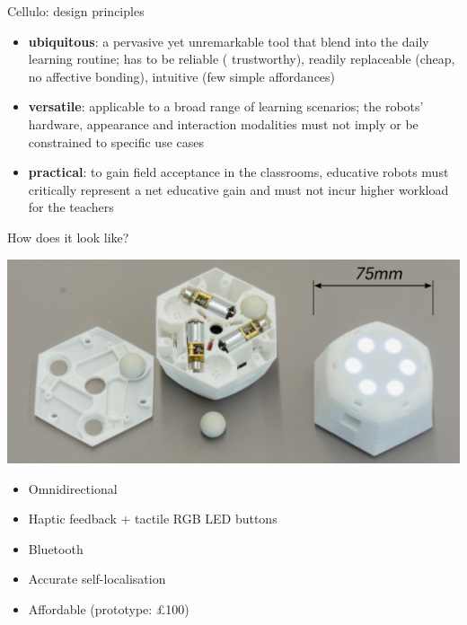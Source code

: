 \documentclass[compress]{beamer}
\begin{document}
{
 \begin{frame}{Cellulo: design principles}

     \begin{itemize}
         \item<1-> {\bf ubiquitous}: a pervasive yet unremarkable tool
             that blend into the daily learning routine; has to be reliable (\ie
             trustworthy), readily replaceable (\ie cheap, no affective bonding), intuitive (\ie few
             simple affordances)

         \item<2-> {\bf versatile}: applicable to a broad range of learning
             scenarios; the robots’ hardware, appearance and interaction
             modalities must not imply or be constrained to specific use cases

         \item<3-> {\bf practical}: to gain field
             acceptance in the classrooms, educative robots must critically
             represent a net educative gain and must not incur higher
             workload for the teachers
     \end{itemize}

 \end{frame}
}

\begin{frame}{How does it look like?}
    \begin{center}
        \includegraphics[width=0.8\linewidth]{cellulo/hardware-design}
    \end{center}
    \begin{itemize}
        \item Omnidirectional
        \item Haptic feedback + tactile RGB LED buttons 
        \item Bluetooth
        \item Accurate self-localisation
        \item<2> Affordable (prototype: \pounds100)
    \end{itemize}
\end{frame}
\end{document}

